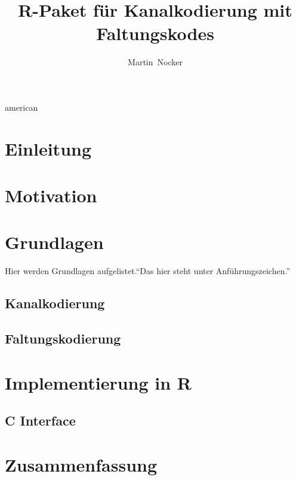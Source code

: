 \documentclass[germanthesis]{thesis-style}
\author{Martin~Nocker}
\title{R-Paket für Kanalkodierung mit Faltungskodes}
\begin{document}
\maketitle
\begin{abstract}

\end{abstract}
\begin{otherlanguage}{american}%
\begin{abstract}

\end{abstract}
\end{otherlanguage}{american}
\tableofcontents
{}

\chapter{Einleitung}
\chapter{Motivation}
\chapter{Grundlagen}
Hier werden Grundlagen aufgelistet\cite{huffman2010fundamentals}.\enquote{Das hier steht unter Anführungszeichen.}
\section{Kanalkodierung}
\section{Faltungskodierung}
\chapter{Implementierung in R}
\section{C Interface}
\chapter{Zusammenfassung}

\cleardoublepage%

\listofabbreviations
\clearpage

\listoffigures
\clearpage

\listoftables
\clearpage

\lstlistoflistings
\clearpage

\printbibliography
\end{document}

